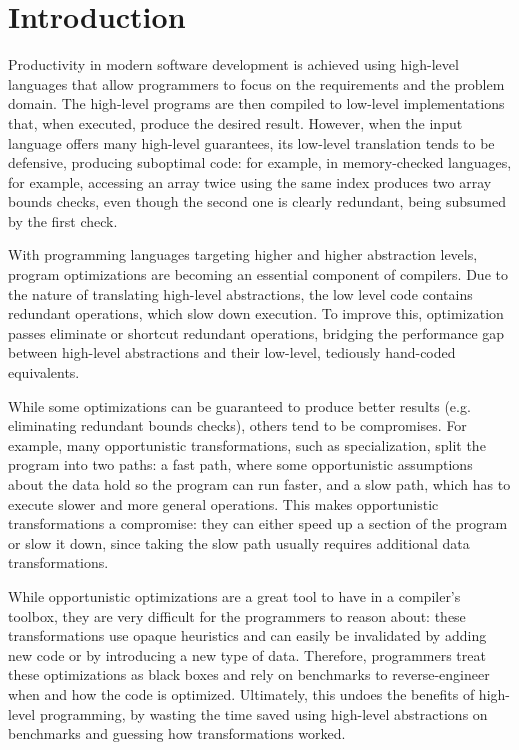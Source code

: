 \section{Introduction}
\label{sec:intro}


Productivity in modern software development is achieved using high-level languages that allow programmers to focus on the requirements and the problem domain. The high-level programs are then compiled to low-level implementations that, when executed, produce the desired result. However, when the input language offers many high-level guarantees, its low-level translation tends to be defensive, producing suboptimal code: for example, in memory-checked languages, for example, accessing an array twice using the same index produces two array bounds checks, even though the second one is clearly redundant, being subsumed by the first check.

With programming languages targeting higher and higher abstraction levels, program optimizations are becoming an essential component of compilers. Due to the nature of translating high-level abstractions, the low level code contains redundant operations, which slow down execution. To improve this, optimization passes eliminate or shortcut redundant operations, bridging the performance gap between high-level abstractions and their low-level, tediously hand-coded equivalents.

While some optimizations can be guaranteed to produce better results (e.g. eliminating redundant bounds checks), others tend to be compromises. For example, many opportunistic transformations, such as specialization, split the program into two paths: a fast path, where some opportunistic assumptions about the data hold so the program can run faster, and a slow path, which has to execute slower and more general operations. This makes opportunistic transformations a compromise: they can either speed up a section of the program or slow it down, since taking the slow path usually requires additional data transformations.

While opportunistic optimizations are a great tool to have in a compiler's toolbox, they are very difficult for the programmers to reason about: these transformations use opaque heuristics and can easily be invalidated by adding new code or by introducing a new type of data. Therefore, programmers treat these optimizations as black boxes and rely on benchmarks to reverse-engineer when and how the code is optimized. Ultimately, this undoes the benefits of high-level programming, by wasting the time saved using high-level abstractions on benchmarks and guessing how transformations worked.

